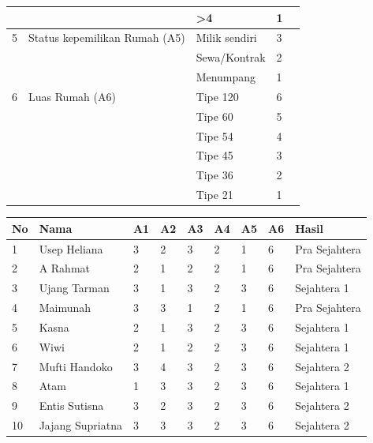 \begin{enumerate}
\begin{table}[!ht]
\begin{tabular}{|l|l|l|l|l|}
   &                               & \textgreater{}4  & 1     &             \\ \hline
5  & Status kepemilikan Rumah (A5) & Milik sendiri    & 3     &             \\ \hline
   &                               & Sewa/Kontrak     & 2     &             \\ \hline
   &                               & Menumpang        & 1     &             \\ \hline
6  & Luas Rumah (A6)               & Tipe 120         & 6     &             \\ \hline
   &                               & Tipe 60          & 5     &             \\ \hline
   &                               & Tipe 54          & 4     &             \\ \hline
   &                               & Tipe 45          & 3     &             \\ \hline
   &                               & Tipe 36          & 2     &             \\ \hline
   &                               & Tipe 21          & 1     &             \\ \hline
\end{tabular}
\end{table}
    \begin{table}[!ht]
    \centering
\begin{tabular}{|l|l|l|l|l|l|l|l|l|}
\hline
No & Nama             & A1 & A2 & A3 & A4 & A5 & A6 & Hasil         \\ \hline
1  & Usep Heliana     & 3  & 2  & 3  & 2  & 1  & 6  & Pra Sejahtera \\ \hline
2  & A Rahmat         & 2  & 1  & 2  & 2  & 1  & 6  & Pra Sejahtera \\ \hline
3  & Ujang Tarman     & 3  & 1  & 3  & 2  & 3  & 6  & Sejahtera 1   \\ \hline
4  & Maimunah         & 3  & 3  & 1  & 2  & 1  & 6  & Pra Sejahtera \\ \hline
5  & Kasna            & 2  & 1  & 3  & 2  & 3  & 6  & Sejahtera 1   \\ \hline
6  & Wiwi             & 2  & 1  & 2  & 2  & 3  & 6  & Sejahtera 1   \\ \hline
7  & Mufti Handoko    & 3  & 4  & 3  & 2  & 3  & 6  & Sejahtera 2   \\ \hline
8  & Atam             & 1  & 3  & 3  & 2  & 3  & 6  & Sejahtera 1   \\ \hline
9  & Entis Sutisna    & 3  & 2  & 3  & 2  & 3  & 6  & Sejahtera 2   \\ \hline
10 & Jajang Supriatna & 3  & 3  & 3  & 2  & 3  & 6  & Sejahtera 2   \\ \hline
\end{tabular}
\end{table}
\end{enumerate}
